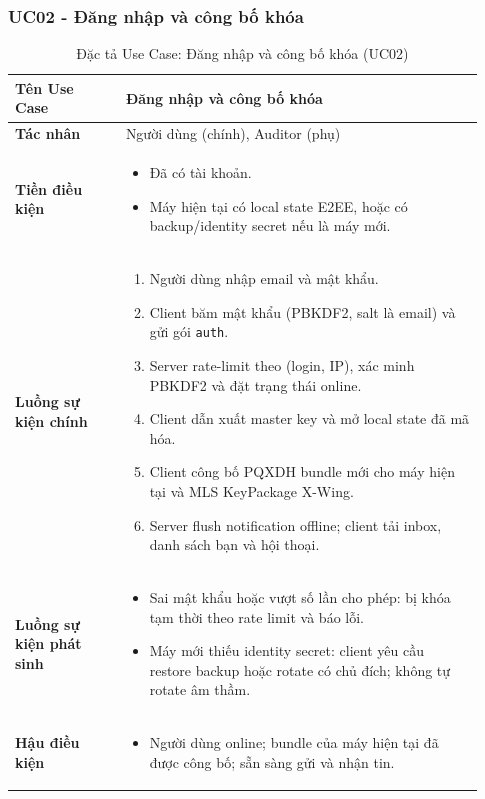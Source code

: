 \subsubsection{UC02 - Đăng nhập và công bố khóa}

\begin{longtable}{|p{0.22\linewidth}|p{0.71\linewidth}|}
\caption{Đặc tả Use Case: Đăng nhập và công bố khóa (UC02)}\label{tab:uc02}\\
\hline
\textbf{Tên Use Case} & Đăng nhập và công bố khóa \\ \hline
\textbf{Tác nhân} & Người dùng (chính), Auditor (phụ) \\ \hline
\textbf{Tiền điều kiện} &
\begin{itemize}
  \item Đã có tài khoản.
  \item Máy hiện tại có local state E2EE, hoặc có backup/identity secret nếu là máy mới.
\end{itemize} \\ \hline
\textbf{Luồng sự kiện chính} &
\begin{enumerate}
  \item Người dùng nhập email và mật khẩu.
  \item Client băm mật khẩu (PBKDF2, salt là email) và gửi gói \texttt{auth}.
  \item Server rate-limit theo (login, IP), xác minh PBKDF2 và đặt trạng thái online.
  \item Client dẫn xuất master key và mở local state đã mã hóa.
  \item Client công bố PQXDH bundle mới cho máy hiện tại và MLS KeyPackage X-Wing.
  \item Server flush notification offline; client tải inbox, danh sách bạn và hội thoại.
\end{enumerate} \\ \hline
\textbf{Luồng sự kiện phát sinh} &
\begin{itemize}
  \item Sai mật khẩu hoặc vượt số lần cho phép: bị khóa tạm thời theo rate limit và báo lỗi.
  \item Máy mới thiếu identity secret: client yêu cầu restore backup hoặc rotate có chủ đích; không tự rotate âm thầm.
\end{itemize} \\ \hline
\textbf{Hậu điều kiện} &
\begin{itemize}
  \item Người dùng online; bundle của máy hiện tại đã được công bố; sẵn sàng gửi và nhận tin.
\end{itemize} \\ \hline
\end{longtable}

